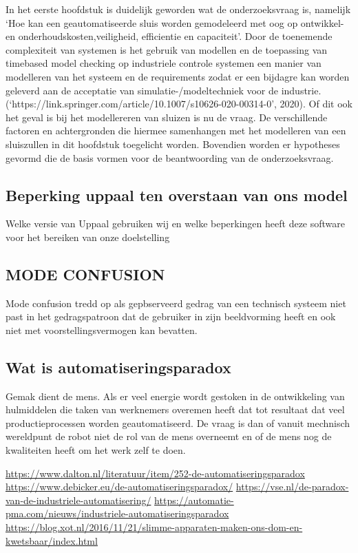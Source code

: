 In het eerste hoofdstuk is duidelijk geworden wat de onderzoeksvraag is, namelijk ‘Hoe kan een geautomatiseerde sluis worden gemodeleerd met oog op ontwikkel- en onderhoudskosten,veiligheid, efficientie en capaciteit’. Door de toenemende complexiteit van systemen is het gebruik van modellen en de toepassing van timebased model checking  op industriele controle systemen een manier van modelleren van het systeem en de requirements zodat er een bijdagre kan worden geleverd aan de acceptatie van  simulatie-/modeltechniek voor de industrie.(‘https://link.springer.com/article/10.1007/s10626-020-00314-0’, 2020). Of dit ook het geval is bij het modellereren van sluizen is nu de vraag.
De verschillende factoren en achtergronden die hiermee samenhangen met het modelleren van een sluiszullen in dit hoofdstuk
toegelicht worden. Bovendien worden er hypotheses gevormd die de basis vormen voor de
beantwoording van de onderzoeksvraag. 



\subsection{Beperking uppaal ten overstaan van ons model}
Welke versie van Uppaal gebruiken wij en welke beperkingen heeft deze software voor het bereiken van onze doelstelling

\subsection{MODE CONFUSION }
Mode confusion tredd op als gepbserveerd gedrag van een technisch systeem niet past in het gedragspatroon dat de gebruiker in zijn beeldvorming heeft  en ook niet met voorstellingsvermogen kan bevatten.
\subsection{Wat is automatiseringsparadox}
Gemak dient de mens. Als er veel energie wordt gestoken in de ontwikkeling van hulmiddelen die taken van werknemers overemen heeft dat tot resultaat dat veel productieprocessen worden geautomatiseerd. De vraag is dan of vanuit mechnisch wereldpunt de robot niet de rol van de mens overneemt en of de mens nog de kwaliteiten heeft om het werk zelf te doen.

\url{https://www.dalton.nl/literatuur/item/252-de-automatiseringsparadox}
\url{https://www.debicker.eu/de-automatiseringsparadox/}
\url{https://vse.nl/de-paradox-van-de-industriele-automatisering/}
\url{https://automatie-pma.com/nieuws/industriele-automatiseringsparadox}
\url{https://blog.xot.nl/2016/11/21/slimme-apparaten-maken-ons-dom-en-kwetsbaar/index.html}

